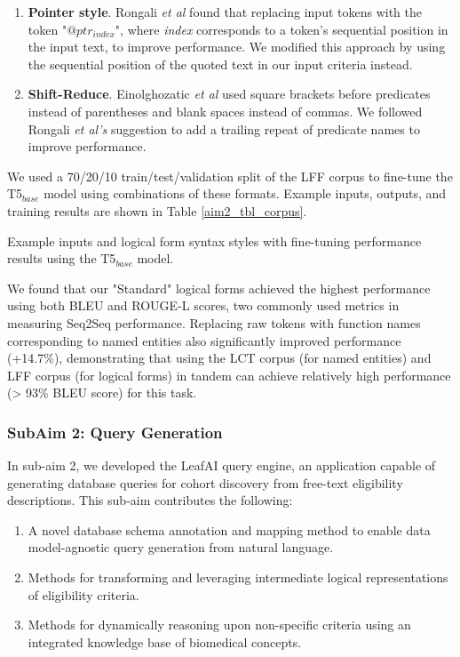 \documentclass[../main.tex]{subfiles}
\begin{document}
\begin{enumerate}
    \item \textbf{Pointer style}. Rongali \textit{et al} found that replacing input tokens with the token "$@ptr_{index}$", where \textit{index} corresponds to a token's sequential position in the input text, to improve performance. We modified this approach by using the sequential position of the quoted text in our input criteria instead.
    \item \textbf{Shift-Reduce}. Einolghozatic \textit{et al} \cite{einolghozati2019improving} used square brackets before predicates instead of parentheses and blank spaces instead of commas. We followed Rongali \textit{et al's} suggestion to add a trailing repeat of predicate names to improve performance.
\end{enumerate}

We used a 70/20/10 train/test/validation split of the LFF corpus to fine-tune the T5$_{base}$ model using combinations of these formats. Example inputs, outputs, and training results are shown in Table \ref{aim2_tbl_corpus}. 

\begin{table}[h!]
    \footnotesize
    \centering
    
    \caption{Example inputs and logical form syntax styles with fine-tuning performance results using the T5$_{base}$ model.}
    \label{aim2_tbl_corpus}
\end{table} 

We found that our "Standard" logical forms achieved the highest performance using both BLEU \cite{lin2004rouge} and ROUGE-L \cite{ callison2006re} scores, two commonly used metrics in measuring Seq2Seq performance. Replacing raw tokens with function names corresponding to named entities also significantly improved performance (+14.7\%), demonstrating that using the LCT corpus (for named entities) and LFF corpus (for logical forms) in tandem can achieve relatively high performance (> 93\% BLEU score) for this task.

\subsubsection{SubAim 2: Query Generation}
In sub-aim 2, we developed the LeafAI query engine, an application capable of generating database queries for cohort discovery from free-text eligibility descriptions. This sub-aim contributes the following:

\begin{enumerate}
    \item{A novel database schema annotation and mapping method to enable data model-agnostic query generation from natural language.}
    \item{Methods for transforming and leveraging intermediate logical representations of eligibility criteria.}
    \item{Methods for dynamically reasoning upon non-specific criteria using an integrated knowledge base of biomedical concepts.}
\end{enumerate}
\end{document}
